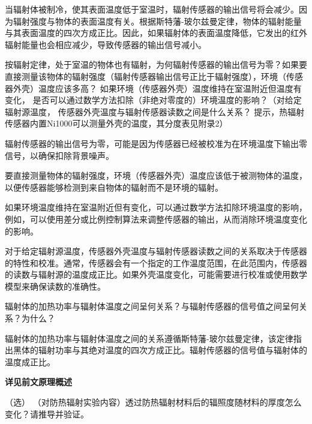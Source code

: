 \documentclass[dvipsnames, svgnames,a4paper,11pt]{article}
\begin{document}
	当辐射体被制冷，使其表面温度低于室温时，辐射传感器的输出信号将会减少。因为辐射强度与物体的表面温度有关。根据斯特藩-玻尔兹曼定律，物体的辐射能量与其表面温度的四次方成正比。因此，如果辐射体的表面温度降低，它发出的红外辐射能量也会相应减少，导致传感器的输出信号减小。	



\begin{question}
	按辐射定律，处于室温的物体也有辐射，为何辐射传感器的输出信号为零？如果要直接测量该物体的辐射强度（辐射传感器输出信号正比于辐射强度），环境（传感器外壳）温度应该多高？ 如果环境（传感器外壳）温度维持在室温附近但温度有变化， 是否可以通过数学方法扣除（非绝对零度的）环境温度的影响？（对给定辐射源温度， 传感器外壳温度与辐射传感器读数之间是什么关系？ 提示，热辐射传感器内置Ni1000可以测量外壳的温度，其分度表见附录2）
\end{question}

	辐射传感器的输出信号为零，可能是因为传感器已经被校准为在环境温度下输出零信号，以确保扣除背景噪声。

	要直接测量物体的辐射强度，环境（传感器外壳）温度应该低于被测物体的温度，以便传感器能够检测到来自物体的辐射而不是环境的辐射。

	如果环境温度维持在室温附近但有变化，可以通过数学方法扣除环境温度的影响，例如，可以使用差分或比例控制算法来调整传感器的输出，从而消除环境温度变化的影响。

	对于给定辐射源温度，传感器外壳温度与辐射传感器读数之间的关系取决于传感器的特性和校准。通常，传感器会有一个指定的工作温度范围，在此范围内，传感器的读数与辐射源的温度成正比。如果外壳温度变化，可能需要进行校准或使用数学模型来确保读数的准确性。






\begin{question}
	辐射体的加热功率与辐射体温度之间呈何关系？与辐射传感器的信号值之间呈何关系？为什么？
\end{question}

	辐射体的加热功率与辐射体温度之间的关系遵循斯特藩-玻尔兹曼定律，该定律指出黑体的辐射功率与其绝对温度的四次方成正比。辐射传感器的信号值与辐射体的温度成正比。

	\textbf{详见前文原理概述}

	


\begin{question}
	（选） （对防热辐射实验内容）透过防热辐射材料后的辐照度随材料的厚度怎么变化？请推导并验证。
\end{question}
\end{document}
